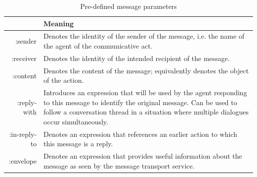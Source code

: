 \documentclass[0main.tex]{subfiles}
\begin{document}
\begin{table}[htbp]
    \footnotesize
    \renewcommand{\arraystretch}{1.8}
    \caption{Pre-defined message parameters \cite{IntelligentPhysicalAgents2001}}
    \centering\begin{tabularx}{.8\textwidth}{>{\ttfamily}rX}
        \toprule
        \multicolumn{1}{p{8em}}{\bf \centering Message \newline Parameter} & \bf \centering Meaning \arraybackslash                \\\midrule
        :sender                                                            & Denotes the identity of the sender of the message,
                                                                            i.e. the name of the agent of the communicative act. \\\midrule
        :receiver                                                          & Denotes the identity of the intended recipient of the
                                                                            message. \\\midrule
        :content                                                           & Denotes the content of the message; equivalently
                                                                            denotes the object of the action. \\\midrule
        :reply-with                                                        & Introduces an expression that will be used by the
                                                                            agent responding to this message to identify the
                                                                            original message. Can be used to follow a
                                                                            conversation thread in a situation where multiple
                                                                            dialogues occur simultaneously. \\\midrule
        :in-reply-to                                                       & Denotes an expression that references an earlier
                                                                            action to which this message is a reply. \\\midrule
        :envelope                                                          & Denotes an expression that provides useful
                                                                            information about the message as seen by the
                                                                            message transport service. \\\midrule

\end{tabularx}
\end{table}
\end{document}
